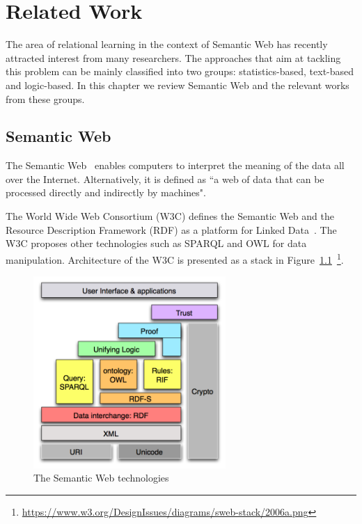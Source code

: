 \chapter{Related Work}
\label{chap:relwork}

The area of relational learning in the context of Semantic Web has recently attracted interest from many researchers. The approaches that aim at tackling this problem can be mainly classified into two groups: statistics-based, text-based and logic-based. In this chapter we review Semantic Web and the relevant works from these groups.

\section{Semantic Web}

The Semantic Web~\cite{ref26} enables computers to interpret the meaning of the data all over the Internet. Alternatively, it is defined as ``a web of data that can be processed directly and indirectly by machines".

The World Wide Web Consortium (W3C) defines the Semantic Web and the Resource Description Framework (RDF) as a platform for Linked Data~\cite{ref26}. The W3C proposes other technologies such as SPARQL and OWL for data manipulation. Architecture of the W3C is presented as a stack in Figure~\ref{fig1}~\footnote{\url{https://www.w3.org/DesignIssues/diagrams/sweb-stack/2006a.png}}.

\begin{figure}
\centering
\includegraphics[width=0.65\textwidth]{figures/semantic_web.png}
\caption{The Semantic Web technologies}
\label{fig1}
\end{figure}

